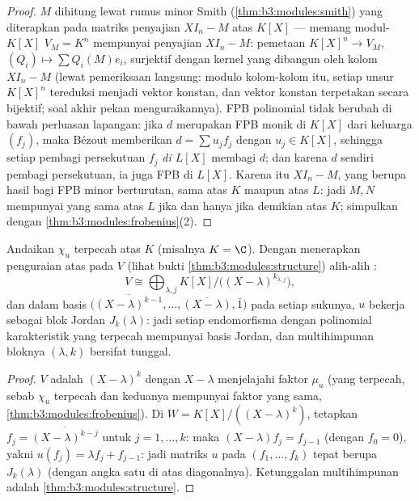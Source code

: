 \begin{proof}
 $M$ dihitung lewat rumus minor Smith
(\cref{thm:b3:modules:smith}) yang diterapkan pada matriks penyajian
$XI_n - M$ atas $K[X]$ --- memang modul-$K[X]$
$V_M = K^n$ mempunyai penyajian $XI_n - M$: pemetaan $K[X]^n \to V_M$,
$(Q_i) \mapsto \sum Q_i(M)e_i$, surjektif dengan kernel yang dibangun oleh
kolom $XI_n - M$ (lewat pemeriksaan langsung: modulo kolom-kolom
itu, setiap unsur $K[X]^n$ tereduksi menjadi vektor konstan,
dan vektor konstan terpetakan secara bijektif; soal akhir pekan
menguraikannya). FPB polinomial tidak berubah di bawah perluasan
lapangan: jika $d$ merupakan FPB monik di $K[X]$ dari keluarga $(f_j)$,
maka Bézout memberikan $d = \sum u_jf_j$ dengan $u_j \in K[X]$, sehingga setiap
pembagi persekutuan $f_j$ \emph{di $L[X]$} membagi $d$; dan karena $d$
sendiri pembagi persekutuan, ia juga FPB di $L[X]$. Karena itu
 $XI_n - M$, yang berupa hasil bagi FPB minor
berturutan, sama atas $K$ maupun atas $L$: jadi $M, N$ mempunyai
 yang sama atas $L$ jika dan hanya jika demikian atas $K$; simpulkan dengan
\cref{thm:b3:modules:frobenius}(2).
\end{proof}

\begin{theorem}\label{thm:b3:modules:jordan}
Andaikan $\chi_u$ terpecah atas $K$ (misalnya $K = \C$). Dengan menerapkan
penguraian atas  pada $V$ (lihat bukti
\cref{thm:b3:modules:structure}) alih-alih :
\[
V \cong \bigoplus_{\lambda, j} K[X]\big/\bigl((X -
\lambda)^{k_{\lambda,j}}\bigr),
\]
dan dalam basis $\bigl(\overline{(X-\lambda)^{k-1}}, \dots,
\overline{(X - \lambda)}, \bar 1\bigr)$ pada setiap sukunya, $u$ bekerja
sebagai blok Jordan $J_k(\lambda)$: jadi setiap endomorfisma dengan polinomial
karakteristik yang terpecah mempunyai basis Jordan, dan multihimpunan
bloknya $(\lambda, k)$ bersifat tunggal.
\end{theorem}

\begin{proof}
  $V$ adalah
$(X - \lambda)^k$ dengan $X - \lambda$ menjelajahi faktor  $\mu_u$ (yang terpecah, sebab $\chi_u$ terpecah dan keduanya
mempunyai faktor  yang sama,
\cref{thm:b3:modules:frobenius}). Di $W = K[X]/((X-\lambda)^k)$,
tetapkan $f_j = \overline{(X - \lambda)^{k-j}}$ untuk $j = 1, \dots, k$:
maka $(X - \lambda)f_j = f_{j-1}$ (dengan $f_0 = 0$), yakni $u(f_j)
= \lambda f_j + f_{j-1}$: jadi matriks $u$ pada $(f_1, \dots,
f_k)$ tepat berupa $J_k(\lambda)$ (dengan angka satu di atas diagonalnya).
Ketunggalan multihimpunan  adalah
\cref{thm:b3:modules:structure}.
\end{proof}

